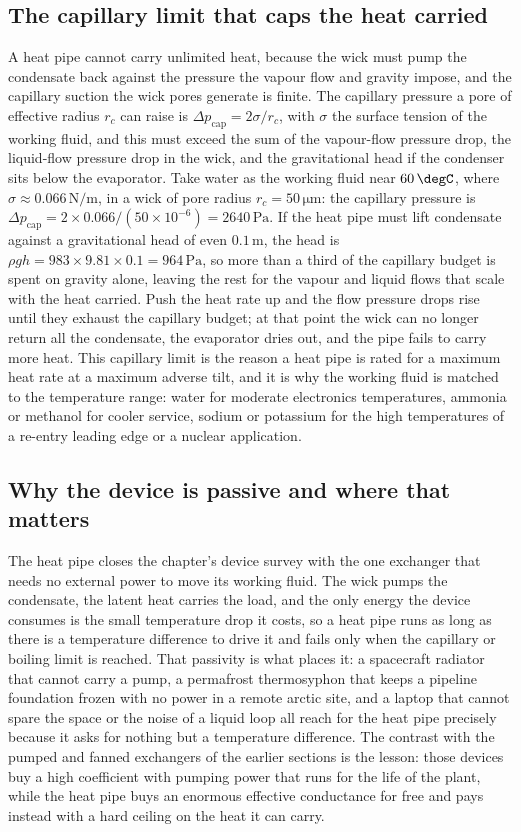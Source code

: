 \subsection{The capillary limit that caps the heat carried}

A heat pipe cannot carry unlimited heat, because the wick must pump the condensate
back against the pressure the vapour flow and gravity impose, and the capillary
suction the wick pores generate is finite. The capillary pressure a pore of
effective radius $r_c$ can raise is $\Delta p_{\text{cap}} = 2\sigma/r_c$, with
$\sigma$ the surface tension of the working fluid, and this must exceed the sum of
the vapour-flow pressure drop, the liquid-flow pressure drop in the wick, and the
gravitational head if the condenser sits below the evaporator. Take water as the
working fluid near $60\,\degC$, where $\sigma \approx 0.066\,\text{N/m}$, in a
wick of pore radius $r_c = 50\,\si{\micro\meter}$: the capillary pressure is
$\Delta p_{\text{cap}} = 2\times 0.066/(50\times 10^{-6}) = 2640\,\text{Pa}$. If
the heat pipe must lift condensate against a gravitational head of even $0.1\,\text{m}$,
the head is $\rho g h = 983\times 9.81\times 0.1 = 964\,\text{Pa}$, so more than a
third of the capillary budget is spent on gravity alone, leaving the rest for the
vapour and liquid flows that scale with the heat carried. Push the heat rate up and
the flow pressure drops rise until they exhaust the capillary budget; at that point
the wick can no longer return all the condensate, the evaporator dries out, and the
pipe fails to carry more heat. This capillary limit is the reason a heat pipe is
rated for a maximum heat rate at a maximum adverse tilt, and it is why the working
fluid is matched to the temperature range: water for moderate electronics
temperatures, ammonia or methanol for cooler service, sodium or potassium for the
high temperatures of a re-entry leading edge or a nuclear application.

\subsection{Why the device is passive and where that matters}

The heat pipe closes the chapter's device survey with the one exchanger that needs
no external power to move its working fluid. The wick pumps the condensate, the
latent heat carries the load, and the only energy the device consumes is the small
temperature drop it costs, so a heat pipe runs as long as there is a temperature
difference to drive it and fails only when the capillary or boiling limit is
reached. That passivity is what places it: a spacecraft radiator that cannot carry
a pump, a permafrost thermosyphon that keeps a pipeline foundation frozen with no
power in a remote arctic site, and a laptop that cannot spare the space or the
noise of a liquid loop all reach for the heat pipe precisely because it asks for
nothing but a temperature difference. The contrast with the pumped and fanned
exchangers of the earlier sections is the lesson: those devices buy a high
coefficient with pumping power that runs for the life of the plant, while the heat
pipe buys an enormous effective conductance for free and pays instead with a hard
ceiling on the heat it can carry.

